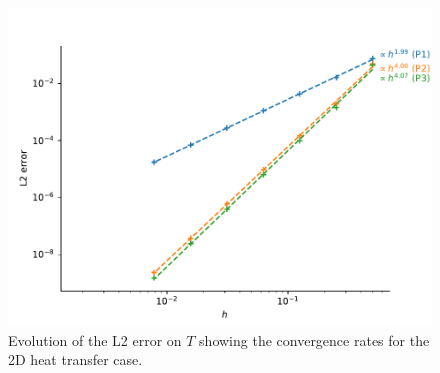 \begin{figure}
    \centering
    \includegraphics[width=\linewidth]{Figures/Chapter2/convergence_rate_heat_transfer.pdf}
    \caption{Evolution of the L2 error on $T$ showing the convergence rates for the 2D heat transfer case.}
    \label{fig: convergence rates heat transfer}
\end{figure}
